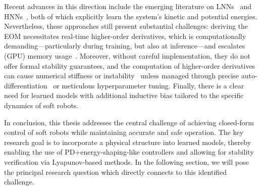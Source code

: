 Recent advances in this direction include the emerging literature on \glspl{LNN}~\cite{lutter2019deep, cranmer2020lagrangian, liu2024physics} and \glspl{HNN}~\cite{greydanus2019hamiltonian, liu2024physics}, both of which explicitly learn the system’s kinetic and potential energies. Nevertheless, these approaches still present substantial challenges: deriving the \gls{EOM} necessitates real-time higher-order derivatives, which is computationally demanding—particularly during training, but also at inference—and escalates (GPU) memory usage~\cite{lutter2019deep}. Moreover, without careful implementation, they do not offer formal stability guarantees, and the computation of higher-order derivatives can cause numerical stiffness or instability~\cite{greydanus2019hamiltonian} unless managed through precise auto-differentiation~\cite{rumelhart1986learning} or meticulous hyperparameter tuning. Finally, there is a clear need for learned models with additional inductive bias tailored to the specific dynamics of soft robots.

In conclusion, this thesis addresses the central challenge of achieving closed-form control of soft robots while maintaining accurate and safe operation. The key research goal is to incorporate a physical structure into learned models, thereby enabling the use of PD+energy-shaping-like controllers and allowing for stability verification via Lyapunov-based methods. In the following section, we will pose the principal research question which directly connects to this identified challenge.

